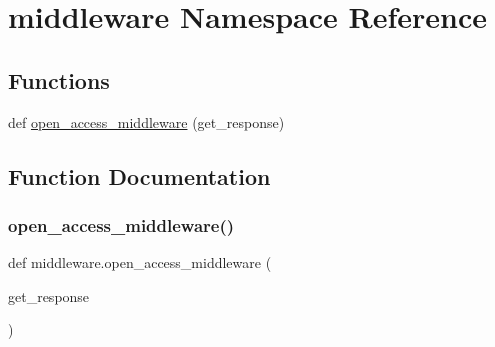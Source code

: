 \hypertarget{namespacemiddleware}{}\section{middleware Namespace Reference}
\label{namespacemiddleware}
\subsection*{Functions}
\begin{DoxyCompactItemize}
\item 
def \hyperlink{namespacemiddleware_a0fb480593c176e8e5caec4633b0d2ef1}{open\+\_\+access\+\_\+middleware} (get\+\_\+response)
\end{DoxyCompactItemize}


\subsection{Function Documentation}
\mbox{\label{namespacemiddleware_a0fb480593c176e8e5caec4633b0d2ef1}} 
\subsubsection{\texorpdfstring{open\+\_\+access\+\_\+middleware()}{open\_access\_middleware()}}
{\footnotesize\ttfamily def middleware.\+open\+\_\+access\+\_\+middleware (\begin{DoxyParamCaption}\item[{}]{get\+\_\+response }\end{DoxyParamCaption})}


